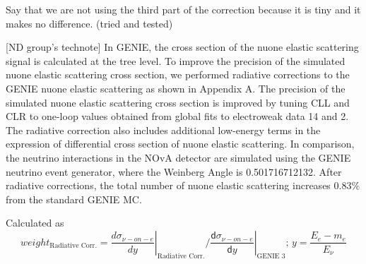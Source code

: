 Say that we are not using the third part of the correction because it is tiny and it makes no difference. (tried and tested)

[ND group's technote] In GENIE, the cross section of the nuone elastic scattering signal is calculated at the tree level. To improve the precision of the simulated nuone elastic scattering cross section, we performed radiative corrections to the GENIE nuone elastic scattering as shown in Appendix A. The precision of the simulated nuone elastic scattering cross section is improved by tuning CLL and CLR to one-loop values obtained from global fits to electroweak data 14 and 2. The radiative correction also includes additional low-energy terms in the expression of differential cross section of nuone elastic scattering. In comparison, the neutrino interactions in the NOvA detector are simulated using the GENIE neutrino event generator, where the Weinberg Angle is 0.501716712132. After radiative corrections, the total number of nuone elastic scattering increases  0.83\% from the standard GENIE MC.

Calculated as 
\begin{equation}
weight_{\text{Radiative Corr.}} = \left.\frac{d\sigma_{\nu-on-e}}{dy}\right|_{\text{Radiative Corr.}} / \left.\frac{\textsf{d}\sigma_{\nu-on-e}}{\textsf{d}y}\right|_{\text{GENIE 3}};\,y=\frac{E_e-m_e}{E_\nu}
\end{equation}

